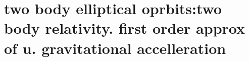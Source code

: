 \section{ two body elliptical oprbits:two body relativity. first order approx of u. gravitational accelleration  }\label{sec:q3}    
